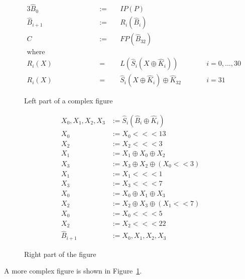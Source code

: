 \documentclass[10pt,twoside,a4paper,bibliography=totoc]{scrbook}
\begin{document}
\begin{figure}
\centering
\footnotesize
\begin{minipage}[b]{0.50\textwidth}
\centering
\begin{alignat*}{3}
	\hat B_0     & := &\;& IP(P)           \\
	\hat B_{i+1} & := &&   R_i(\hat B_i)   \\
	C            & := &&   FP(\hat B_{32}) \\
	\text{where~~~~~~~~~~~~~~~~~~~~~}      \\
	R_i(X)       & =  &&   L(\hat S_i(X \oplus \hat K_i))
						&\qquad& i = 0, \ldots, 30 \\
	R_i(X)       & =  &&   \hat S_i(X \oplus \hat K_i) \oplus \hat K_{32}
						&& i = 31
\end{alignat*}
\caption{Left part of a complex figure}
\label{fig:serpentcode}
\end{minipage}
\hspace{0.25cm}
\vline
\hspace{0.25cm}
\begin{minipage}[b]{0.40\textwidth}
\centering
\begin{align*}
	X_0,X_1,X_2,X_3 & := \hat S_i(\hat B_i \oplus \hat K_i) \\
	X_0             & := X_0 <<< 13 \\
	X_2             & := X_2 <<< 3 \\
	X_1             & := X_1 \oplus X_0 \oplus X_2 \\
	X_3             & := X_3 \oplus X_2 \oplus (X_0 << 3) \\
	X_1             & := X_1 <<< 1 \\
	X_3             & := X_3 <<< 7 \\
	X_0             & := X_0 \oplus X_1 \oplus X_3 \\
	X_2             & := X_2 \oplus X_3 \oplus (X_1 << 7) \\
	X_0             & := X_0 <<< 5 \\
	X_2             & := X_2 <<< 22 \\
	\hat B_{i+1}    & := X_0,X_1,X_2,X_3
\end{align*}
\caption{Right part of the figure}
\label{fig:serpentlin}
\end{minipage}
\end{figure}

A more complex figure is shown in Figure~\ref{fig:serpentlin}. \blindtext
\end{document}
